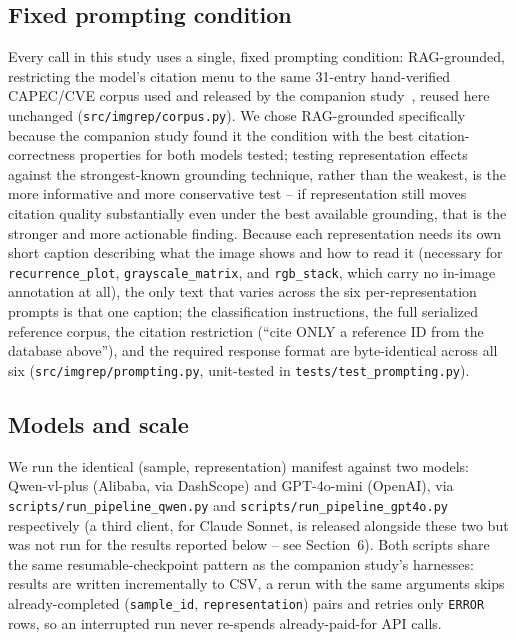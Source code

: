 \documentclass[twocolumn]{svjour3}
\begin{document}
\subsection{Fixed prompting condition}

Every call in this study uses a single, fixed prompting condition: RAG-grounded, restricting the
model's citation menu to the same 31-entry hand-verified CAPEC/CVE corpus used and released by the
companion study~\cite{groundingcitation2026}, reused here unchanged
(\texttt{src/imgrep/corpus.py}). We chose RAG-grounded specifically because the companion study
found it the condition with the best citation-correctness properties for both models tested; testing
representation effects against the strongest-known grounding technique, rather than the weakest, is
the more informative and more conservative test -- if representation still moves citation quality
substantially even under the best available grounding, that is the stronger and more actionable
finding. Because each representation needs its own short caption describing what the image shows
and how to read it (necessary for \texttt{recurrence\_plot}, \texttt{grayscale\_matrix}, and
\texttt{rgb\_stack}, which carry no in-image annotation at all), the only text that varies across
the six per-representation prompts is that one caption; the classification instructions, the full
serialized reference corpus, the citation restriction (``cite ONLY a reference ID from the database
above''), and the required response format are byte-identical across all six
(\texttt{src/imgrep/prompting.py}, unit-tested in \texttt{tests/test\_prompting.py}).

\subsection{Models and scale}

We run the identical (sample, representation) manifest against two models: Qwen-vl-plus (Alibaba,
via DashScope) and GPT-4o-mini (OpenAI), via \texttt{scripts/run\_pipeline\_qwen.py} and
\texttt{scripts/run\_pipeline\_gpt4o.py} respectively (a third client, for Claude Sonnet, is
released alongside these two but was not run for the results reported below -- see Section~6).
Both scripts share the same resumable-checkpoint pattern as the
companion study's harnesses: results are written incrementally to CSV, a rerun with the same
arguments skips already-completed (\texttt{sample\_id}, \texttt{representation}) pairs and retries
only \texttt{ERROR} rows, so an interrupted run never re-spends already-paid-for API calls.
\end{document}
